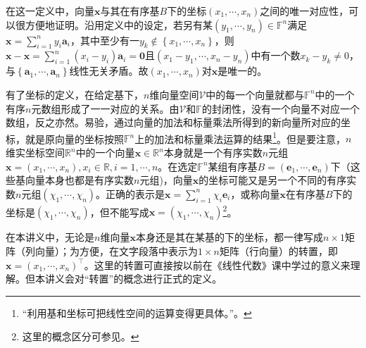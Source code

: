 \documentclass[../main.tex]{subfiles}
\begin{document}
在这一定义中，向量$\mathbf{x}$与其在有序基$B$下的坐标$\left(x_1,\cdots,x_n\right)$之间的唯一对应性，可以很方便地证明。沿用定义中的设定，若另有某$\left(y_1,\cdots,y_n\right)\in\mathbb{F}^n$满足$\mathbf{x}=\sum_{i=1}^ny_i\mathbf{a}_i$，其中至少有一$y_k\notin\left\{x_1,\cdots,x_n\right\}$，则$\mathbf{x}-\mathbf{x}=\sum_{i=1}^n\left(x_i-y_i\right)\mathbf{a}_i=\mathbf{0}$且$\left(x_1-y_1,\cdots,x_n-y_n\right)$中有一个数$x_k-y_k\neq 0$，与$\left\{\mathbf{a}_1,\cdots,\mathbf{a}_n\right\}$线性无关矛盾。故$\left(x_1,\cdots,x_n\right)$对$\mathbf{x}$是唯一的。

有了坐标的定义，在给定基下，$n$维向量空间$\mathcal{V}$中的每一个向量就都与$\mathbb{F}^n$中的一个有序$n$元数组形成了一一对应的关系。由$\mathcal{V}$和$\mathbb{F}$的封闭性，没有一个向量不对应一个数组，反之亦然。易验，通过向量的加法和标量乘法所得到的新向量所对应的坐标，就是原向量的坐标按照$\mathbb{F}^n$上的加法和标量乘法运算的结果\footnote{“利用基和坐标可把线性空间的运算变得更具体。”\cite[p.173]{周胜林2012线性代数}。}。但是要注意，$n$维实坐标空间$\mathbb{R}^n$中的一个向量$\mathbf{x}\in\mathbb{R}^n$本身就是一个有序实数$n$元组$\mathbf{x}=\left(x_1,\cdots,x_n\right),x_i\in\mathbb{R},i=1,\cdots,n$。在选定$\mathbb{F}^n$某组有序基$B=\left(\mathbf{e}_1,\cdots,\mathbf{e}_n\right)$下（这些基向量本身也都是有序实数$n$元组)，向量$\mathbf{x}$的坐标可能又是另一个不同的有序实数$n$元组$\left(\chi_1,\cdots,\chi_n\right)$。正确的表示是$\mathbf{x}=\sum_{i=1}^{n}\chi_i\mathbf{e}_i$，或称向量$\mathbf{x}$在有序基$B$下的坐标是$\left(\chi_1,\cdots,\chi_n\right)$，但不能写成$\mathbf{x}=\left(\chi_1,\cdots,\chi_n\right)$\footnote{这里的概念区分可参见\cite[例题2.1,p.~173]{周胜林2012线性代数}。}。

在本讲义中，无论是$n$维向量$\mathbf{x}$本身还是其在某基的下的坐标，都一律写成$n\times 1$矩阵（列向量）；为方便，在文字段落中表示为$1\times n$矩阵（行向量）的转置，即$\mathbf{x}=\left(x_1,\cdots,x_n\right)^\intercal$。这里的转置可直接按以前在《线性代数》课中学过的意义来理解。但本讲义会对“转置”的概念进行正式的定义。
\end{document}
